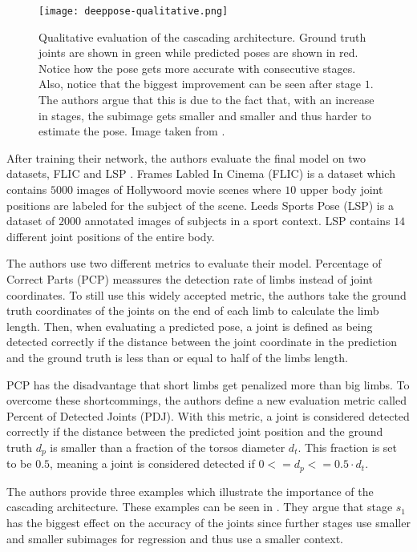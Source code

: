 \begin{figure}[htb!]
    \centering
    \texttt{[image: deeppose-qualitative.png]}
    \caption{Qualitative evaluation of the cascading architecture. Ground truth joints are shown in green while predicted poses are shown in red. Notice how the pose gets more accurate with consecutive stages. Also, notice that the biggest improvement can be seen after stage $1$. The authors argue that this is due to the fact that, with an increase in stages, the subimage gets smaller and smaller and thus harder to estimate the pose. Image taken from \cite{toshev_deeppose:_2014}.}
    \label{fig:deeppose-qualitative}
\end{figure}

After training their network, the authors evaluate the final model on two datasets, FLIC \cite{sapp_modec:_2013} and LSP \cite{johnson_clustered_2010}.
Frames Labled In Cinema (FLIC) is a dataset which contains $5000$ images of Hollywoord movie scenes where $10$ upper body joint positions are labeled for the subject of the scene.
Leeds Sports Pose (LSP) is a dataset of $2000$ annotated images of subjects in a sport context.
LSP contains $14$ different joint positions of the entire body.

The authors use two different metrics to evaluate their model.
Percentage of Correct Parts (PCP) \cite{eichner_articulated_2010} meassures the detection rate of limbs instead of joint coordinates.
To still use this widely accepted metric, the authors take the ground truth coordinates of the joints on the end of each limb to calculate the limb length.
Then, when evaluating a predicted pose, a joint is defined as being detected correctly if the distance between the joint coordinate in the prediction and the ground truth is less than or equal to half of the limbs length.

PCP has the disadvantage that short limbs get penalized more than big limbs.
To overcome these shortcommings, the authors define a new evaluation metric called Percent of Detected Joints (PDJ).
With this metric, a joint is considered detected correctly if the distance between the predicted joint position and the ground truth $d_p$ is smaller than a fraction of the torsos diameter $d_t$.
This fraction is set to be $0.5$, meaning a joint is considered detected if $0 <= d_p <= 0.5 \cdot d_t$.

The authors provide three examples which illustrate the importance of the cascading architecture.
These examples can be seen in .
They argue that stage $s_1$ has the biggest effect on the accuracy of the joints since further stages use smaller and smaller subimages for regression and thus use a smaller context.


